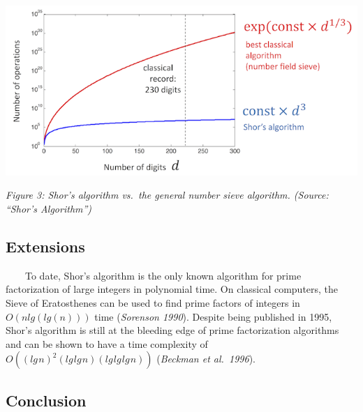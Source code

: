 \documentclass[11pt]{article}
\makeatletter
\def\maxwidth{\ifdim\Gin@nat@width>\linewidth\linewidth
    \else\Gin@nat@width\fi}
\let\Oldincludegraphics\includegraphics
\renewcommand{\includegraphics}[1]{\Oldincludegraphics[width=.8\maxwidth]{#1}}
\makeatother
\begin{document}
\includegraphics{./shor-vs-classical.png}

\emph{Figure 3: Shor's algorithm vs.~the general number sieve algorithm.
(Source: ``Shor's Algorithm'')}

    \hypertarget{extensions}{%
\subsection{Extensions}\label{extensions}}

~~~~To date, Shor's algorithm is the only known algorithm for prime
factorization of large integers in polynomial time. On classical
computers, the Sieve of Eratosthenes can be used to find prime factors
of integers in \(O(nlg(lg(n)))\) time (\emph{Sorenson 1990}). Despite
being published in 1995, Shor's algorithm is still at the bleeding edge
of prime factorization algorithms and can be shown to have a time
complexity of
\(O((lg\hspace{1pt}n)^2(lg\hspace{1pt}lg\hspace{1pt}n)(lg\hspace{1pt}lg\hspace{1pt}lg\hspace{1pt}n))\)
(\emph{Beckman et al.~1996}).

    \hypertarget{conclusion}{%
\subsection{Conclusion}\label{conclusion}}
\end{document}
